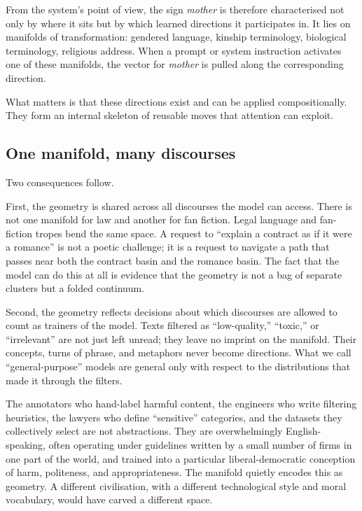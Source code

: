 \documentclass[12pt,a4paper]{book}
\begin{document}
From the system's point of view, the sign \emph{mother} is therefore characterised not only by where it sits but by which learned directions it participates in. It lies on manifolds of transformation: gendered language, kinship terminology, biological terminology, religious address. When a prompt or system instruction activates one of these manifolds, the vector for \emph{mother} is pulled along the corresponding direction.

What matters is that these directions exist and can be applied compositionally. They form an internal skeleton of reusable moves that attention can exploit.

\subsection*{One manifold, many discourses}

Two consequences follow.

First, the geometry is shared across all discourses the model can access. There is not one manifold for law and another for fan fiction. Legal language and fan-fiction tropes bend the same space. A request to ``explain a contract as if it were a romance'' is not a poetic challenge; it is a request to navigate a path that passes near both the contract basin and the romance basin. The fact that the model can do this at all is evidence that the geometry is not a bag of separate clusters but a folded continuum.

Second, the geometry reflects decisions about which discourses are allowed to count as trainers of the model. Texts filtered as ``low-quality,'' ``toxic,'' or ``irrelevant'' are not just left unread; they leave no imprint on the manifold. Their concepts, turns of phrase, and metaphors never become directions. What we call ``general-purpose'' models are general only with respect to the distributions that made it through the filters.

The annotators who hand-label harmful content, the engineers who write filtering heuristics, the lawyers who define ``sensitive'' categories, and the datasets they collectively select are not abstractions. They are overwhelmingly English-speaking, often operating under guidelines written by a small number of firms in one part of the world, and trained into a particular liberal-democratic conception of harm, politeness, and appropriateness. The manifold quietly encodes this as geometry. A different civilisation, with a different technological style and moral vocabulary, would have carved a different space.
\end{document}
